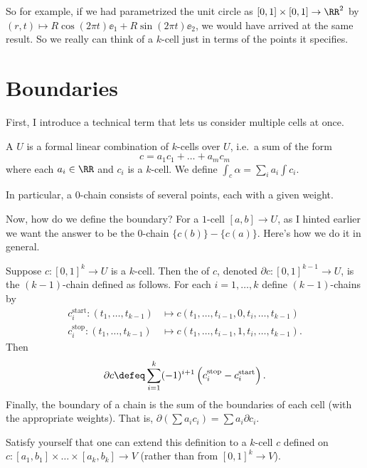 So for example, if we had parametrized the unit circle as $[0,1] \times [0,1] \to \RR^2$
by $(r,t) \mapsto R\cos(2\pi t) \ee_1 + R\sin(2\pi t) \ee_2$, we would have arrived at the same result.
So we really can think of a $k$-cell just in terms of the points it specifies.

\section{Boundaries}
First, I introduce a technical term that lets us consider multiple cells at once.
\begin{definition}
	A  $U$ is a formal
	linear combination of $k$-cells over $U$,
	i.e.\ a sum of the form
	\[ c = a_1 c_1 + \dots + a_m c_m \]
	where each $a_i \in \RR$ and $c_i$ is a $k$-cell.
	We define $\int_c \alpha = \sum_i a_i \int c_i$.
\end{definition}
In particular, a $0$-chain consists of several points, each with a given weight.

Now, how do we define the boundary?
For a $1$-cell $[a,b] \to U$, as I hinted earlier we want the answer to be the $0$-chain $\{c(b)\}-\{c(a)\}$.
Here's how we do it in general.
\begin{definition}
	Suppose $c \colon [0,1]^k \to U$ is a $k$-cell.
	Then the  of $c$, denoted $\partial c \colon [0,1]^{k-1} \to U$,
	is the $(k-1)$-chain defined as follows.
	For each $i = 1,\dots,k$ define $(k-1)$-chains by
	\begin{align*}
		c_i^{\text{start}} \colon (t_1, \dots, t_{k-1}) &\mapsto
			c(t_1, \dots, t_{i-1}, 0, t_i, \dots, t_{k-1}) \\
		c_i^{\text{stop}} \colon (t_1, \dots, t_{k-1}) & \mapsto
			c(t_1, \dots, t_{i-1}, 1, t_i, \dots, t_{k-1}).
	\end{align*}
	Then
	\[ \partial c \defeq
	\sum_{i=1}^k (-1)^{i+1} \left( c_i^{\text{stop}} - c_i^{\text{start}}  \right). \]
	Finally, the boundary of a chain is the sum of the boundaries of each cell (with the appropriate weights).
	That is, $\partial(\sum a_ic_i) = \sum a_i \partial c_i$.
\end{definition}
\begin{ques}
	Satisfy yourself that one can extend this definition to
	a $k$-cell $c$ defined on $c \colon [a_1, b_1] \times \dots \times [a_k, b_k] \to V$
	(rather than from $[0,1]^k \to V$).
\end{ques}

